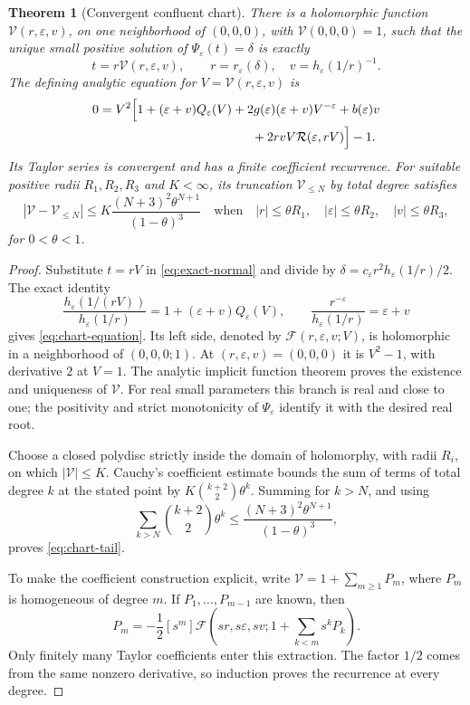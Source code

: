 \documentclass[11pt,a4paper]{article}
\numberwithin{equation}{section}
\newtheorem{theorem}{Theorem}[section]
\theoremstyle{definition}
\theoremstyle{remark}
\newcommand{\eps}{\varepsilon}
\newcommand{\cV}{\mathcal V}
\newcommand{\cR}{\mathcal R}
\begin{document}
\begin{theorem}[Convergent confluent chart]
\label{thm:chart}
There is a holomorphic function \(\cV(r,\eps,v)\), on one neighborhood of
\((0,0,0)\), with \(\cV(0,0,0)=1\), such that the unique small positive
solution of \(\Psi_\eps(t)=\delta\) is exactly
\begin{equation}
 t=r\cV(r,\eps,v),\qquad
 r=r_\eps(\delta),\quad v=h_\eps(1/r)^{-1}.
 \label{eq:chart}
\end{equation}
The defining analytic equation for \(V=\cV(r,\eps,v)\) is
\begin{align}
 0={}&V^2\Bigl[1+(\eps+v)Q_\eps(V)
     +2g(\eps)(\eps+v)V^{-\eps}+b(\eps)v \nonumber\\
    &\hspace{38mm}+2rvV\cR(\eps,rV)\Bigr]-1.
 \label{eq:chart-equation}
\end{align}
Its Taylor series is convergent and has a finite coefficient recurrence.
For suitable positive radii \(R_1,R_2,R_3\) and \(K<\infty\), its
truncation \(\cV_{\le N}\) by total degree satisfies
\begin{equation}
 |\cV-\cV_{\le N}|
 \le K\frac{(N+3)^2\theta^{N+1}}{(1-\theta)^3}
 \quad\text{when}\quad
 |r|\le\theta R_1,\quad |\eps|\le\theta R_2,\quad |v|\le\theta R_3,
 \label{eq:chart-tail}
\end{equation}
for \(0<\theta<1\).
\end{theorem}
\begin{proof}
Substitute \(t=rV\) in \eqref{eq:exact-normal} and divide by
\(\delta=c_\eps r^2h_\eps(1/r)/2\). The exact identity
\[
 \frac{h_\eps(1/(rV))}{h_\eps(1/r)}
 =1+(\eps+v)Q_\eps(V),\qquad
 \frac{r^{-\eps}}{h_\eps(1/r)}=\eps+v
\]
gives \eqref{eq:chart-equation}. Its left side, denoted by
\(\mathscr F(r,\eps,v;V)\), is holomorphic in a neighborhood of
\((0,0,0;1)\). At \((r,\eps,v)=(0,0,0)\) it is \(V^2-1\), with derivative
\(2\) at \(V=1\). The analytic implicit function theorem proves the existence
and uniqueness of \(\cV\). For real small parameters this branch is real and
close to one; the positivity and strict monotonicity of \(\Psi_\eps\) identify
it with the desired real root.

Choose a closed polydisc strictly inside the domain of holomorphy, with radii
\(R_i\), on which \(|\cV|\le K\). Cauchy's coefficient estimate bounds the
sum of terms of total degree \(k\) at the stated point by
\(K\binom{k+2}{2}\theta^k\). Summing for \(k>N\), and using
\[
 \sum_{k>N}\binom{k+2}{2}\theta^k
 \le\frac{(N+3)^2\theta^{N+1}}{(1-\theta)^3},
\]
proves \eqref{eq:chart-tail}.

To make the coefficient construction explicit, write
\(\cV=1+\sum_{m\ge1}P_m\), where \(P_m\) is homogeneous of degree \(m\).
If \(P_1,\ldots,P_{m-1}\) are known, then
\begin{equation}
 P_m=-\frac12[s^m]\mathscr F\left(sr,s\eps,sv;
                  1+\sum_{k<m}s^kP_k\right).
 \label{eq:chart-recursion}
\end{equation}
Only finitely many Taylor coefficients enter this extraction. The factor
\(1/2\) comes from the same nonzero derivative, so induction proves the
recurrence at every degree.
\end{proof}
\end{document}
